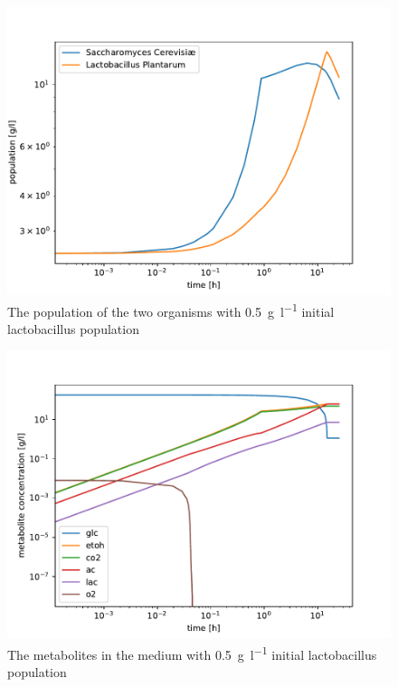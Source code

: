 		\begin{figure}[h]
			\includegraphics[width=\linewidth]{figures/results/cocultures/1_populations.pdf}
			\caption{The population of the two organisms with \SI{0.5}{\gram\per\litre} initial lactobacillus population}
			\label{fig:cocult_1_pop}
		\end{figure}
		
		\begin{figure}[h]
			\includegraphics[width=\linewidth]{figures/results/cocultures/1_metabolites.pdf}
			\caption{The metabolites in the medium with \SI{0.5}{\gram\per\litre} initial lactobacillus population}
			\label{fig:cocult_1_met}
		\end{figure}
		
